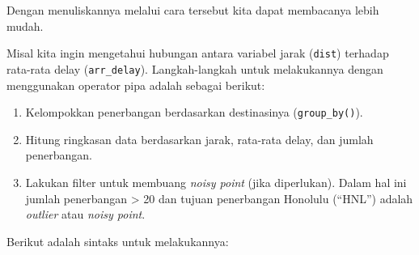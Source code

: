 \documentclass[]{book}
\newenvironment{Shaded}{\begin{snugshade}}{\end{snugshade}}
\newcommand{\KeywordTok}[1]{\textcolor[rgb]{0.13,0.29,0.53}{\textbf{#1}}}
\newcommand{\DataTypeTok}[1]{\textcolor[rgb]{0.13,0.29,0.53}{#1}}
\newcommand{\DecValTok}[1]{\textcolor[rgb]{0.00,0.00,0.81}{#1}}
\newcommand{\StringTok}[1]{\textcolor[rgb]{0.31,0.60,0.02}{#1}}
\newcommand{\CommentTok}[1]{\textcolor[rgb]{0.56,0.35,0.01}{\textit{#1}}}
\newcommand{\OtherTok}[1]{\textcolor[rgb]{0.56,0.35,0.01}{#1}}
\newcommand{\OperatorTok}[1]{\textcolor[rgb]{0.81,0.36,0.00}{\textbf{#1}}}
\newcommand{\NormalTok}[1]{#1}
\providecommand{\tightlist}{%
  \setlength{\itemsep}{0pt}\setlength{\parskip}{0pt}}
\begin{document}
Dengan menuliskannya melalui cara tersebut kita dapat membacanya lebih
mudah.

Misal kita ingin mengetahui hubungan antara variabel jarak
(\texttt{dist}) terhadap rata-rata delay (\texttt{arr\_delay}).
Langkah-langkah untuk melakukannya dengan menggunakan operator pipa
adalah sebagai berikut:

\begin{enumerate}
\def\labelenumi{\arabic{enumi}.}
\tightlist
\item
  Kelompokkan penerbangan berdasarkan destinasinya
  (\texttt{group\_by()}).
\item
  Hitung ringkasan data berdasarkan jarak, rata-rata delay, dan jumlah
  penerbangan.
\item
  Lakukan filter untuk membuang \emph{noisy point} (jika diperlukan).
  Dalam hal ini jumlah penerbangan \textgreater{} 20 dan tujuan
  penerbangan Honolulu (``HNL'') adalah \emph{outlier} atau \emph{noisy
  point}.
\end{enumerate}

Berikut adalah sintaks untuk melakukannya:

\begin{Shaded}
\end{Shaded}
\end{document}
